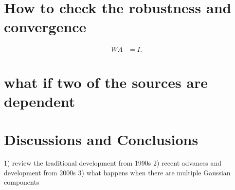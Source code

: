 \documentclass[aps,prl,preprint,superscriptaddress]{revtex4-2}
\begin{document}
\section{How to check the robustness and convergence}

\begin{align}
W A &= I.
\end{align}



\section{what if two of the sources are dependent}

\section{Discussions and Conclusions}
1) review the traditional development from 1990s
2) recent advances and development from 2000s  
3) what happens when there are multiple Gaussian components
\end{document}
